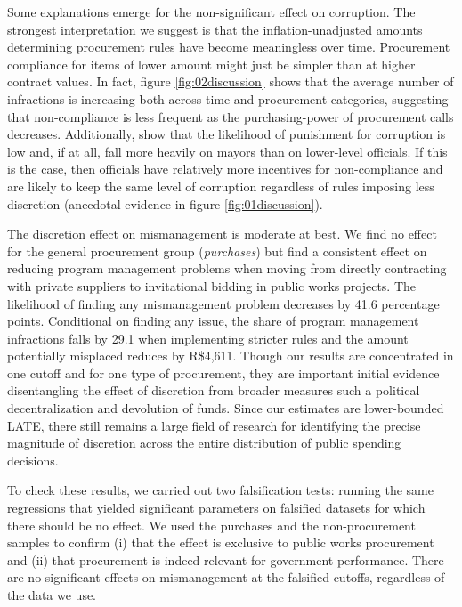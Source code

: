 \documentclass[11pt]{article}
\begin{document}
Some explanations emerge for the non-significant effect on corruption. The strongest interpretation we suggest is that the inflation-unadjusted amounts determining procurement rules have become meaningless over time. Procurement compliance for items of lower amount might just be simpler than at higher contract values. In fact, figure \ref{fig:02discussion} shows that the average number of infractions is increasing both across time and procurement categories, suggesting that non-compliance is less frequent as the purchasing-power of procurement calls decreases. Additionally, \citet{AvisGovernmentAuditsReduce2018} show that the likelihood of punishment for corruption is low and, if at all, fall more heavily on mayors than on lower-level officials. If this is the case, then officials have relatively more incentives for non-compliance and are likely to keep the same level of corruption regardless of rules imposing less discretion (anecdotal evidence in figure \ref{fig:01discussion}).

The discretion effect on mismanagement is moderate at best. We find no effect for the general procurement group (\emph{purchases}) but find a consistent effect on reducing program management problems when moving from directly contracting with private suppliers to invitational bidding in public works projects. The likelihood of finding any mismanagement problem decreases by 41.6 percentage points. Conditional on finding any issue, the share of program management infractions falls by 29.1 when implementing stricter rules and the amount potentially misplaced reduces by R\$4,611. Though our results are concentrated in one cutoff and for one type of procurement, they are important initial evidence disentangling the effect of discretion from broader measures such a political decentralization and devolution of funds. Since our estimates are lower-bounded LATE, there still remains a large field of research for identifying the precise magnitude of discretion across the entire distribution of public spending decisions.

To check these results, we carried out two falsification tests: running the same regressions that yielded significant parameters on falsified datasets for which there should be no effect. We used the purchases and the non-procurement samples to confirm (i) that the effect is exclusive to public works procurement and (ii) that procurement is indeed relevant for government performance. There are no significant effects on mismanagement at the falsified cutoffs, regardless of the data we use.
\end{document}
